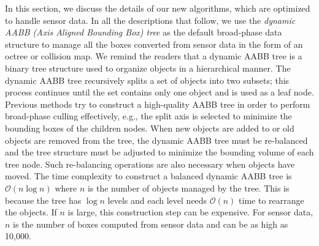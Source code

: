 In this section, we discuss the details of our new algorithms,
which are optimized to handle sensor data. In all the descriptions that follow,
we use the \emph{dynamic AABB (Axis Aligned Bounding Box) tree} as the default broad-phase data structure to manage all the boxes converted from sensor data in the form of an octree or collision map. We remind the readers that a dynamic AABB tree is a binary tree
structure used to organize objects in a hierarchical manner. The dynamic AABB tree recursively splits a set of objects into two subsets; this process continues until the set contains only one object and is used as a leaf node. Previous methods try to construct a high-quality AABB tree in order to perform broad-phase culling effectively, e.g., the split axis is selected to minimize the
bounding boxes of the children nodes. When new objects
are added to or old objects are removed from the tree, the dynamic AABB tree must be
re-balanced and the tree structure must be adjusted to minimize the bounding volume of
each tree node. Such re-balancing operations are also necessary when
objects have moved. The time complexity to construct a balanced dynamic AABB tree is $\mathcal
O(n \log n)$ where $n$ is the number of objects managed by the
tree. This is because the tree has $\log n$ levels and each level
needs $\mathcal O(n)$ time to rearrange the objects. If $n$ is large,
this construction step can be expensive. For sensor data, $n$ is the number of boxes computed from sensor data and can be as high as 10,000.

